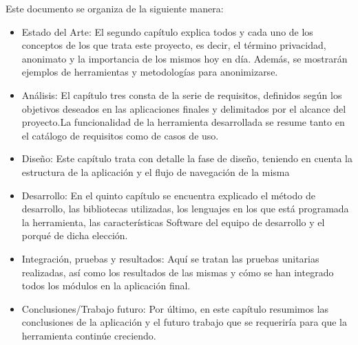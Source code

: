 Este documento se organiza de la siguiente manera:
\begin{itemize}
	\item Estado  del  Arte: El segundo capítulo explica todos y cada uno de los conceptos de los que trata este proyecto, es decir, el término privacidad, anonimato y la importancia de los mismos hoy en día. Además, se mostrarán ejemplos de herramientas y metodologías para anonimizarse. 
	\item Análisis: El capítulo tres consta de la serie de requisitos, definidos  según  los objetivos  deseados  en  las  aplicaciones  finales  y  delimitados  por  el  alcance  del proyecto.La funcionalidad de la herramienta desarrollada se resume tanto en el catálogo de requisitos como de casos de uso.
	\item Diseño: Este capítulo trata con detalle la fase de diseño, teniendo en cuenta la estructura de la aplicación y el flujo de navegación de la misma 
	\item Desarrollo: En el quinto capítulo se encuentra explicado el método de desarrollo, las bibliotecas utilizadas, los lenguajes en los que está programada la herramienta, las características Software del equipo de desarrollo y el porqué de dicha elección.
	\item Integración, pruebas y resultados: Aquí se tratan las pruebas unitarias realizadas, así como los resultados de las mismas y cómo se han integrado todos los módulos en la aplicación final.
	\item Conclusiones/Trabajo  futuro: Por último, en este capítulo resumimos las conclusiones de la aplicación y el futuro trabajo que se requeriría para que la herramienta continúe creciendo.
\end{itemize}

\newpage \thispagestyle{empty} %